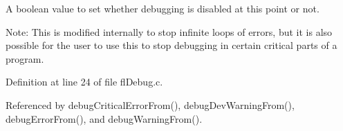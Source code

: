 A boolean value to set whether debugging is disabled at this point or not. 

\begin{Desc}
\item[Note:]This is modified internally to stop infinite loops of errors, but it is also possible for the user to use this to stop debugging in certain critical parts of a program. \end{Desc}


Definition at line 24 of file fl\-Debug.c.

Referenced by debug\-Critical\-Error\-From(), debug\-Dev\-Warning\-From(), debug\-Error\-From(), and debug\-Warning\-From().